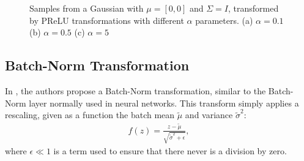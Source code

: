 \begin{figure}[!htb]
  \begin{subfigmatrix}{3}
  \end{subfigmatrix}
    \caption{Samples from a Gaussian with $\mu = [0, 0]$ and $\Sigma = I$, transformed
    by PReLU transformations with different $\alpha$ parameters. (a) $\alpha = 0.1$
    (b) $\alpha = 0.5$ (c) $\alpha = 5$}
  \label{fig:prelu}
\end{figure}

\subsection{Batch-Norm Transformation}
In \cite{realnvp}, the authors propose a Batch-Norm transformation, similar to
the Batch-Norm layer normally used in neural networks. This transform simply
applies a rescaling, given as a function the batch mean $\tilde\mu$ and variance
${\tilde\sigma}^2$:
\begin{align}
    f(z) = \frac{z - \tilde\mu}{\sqrt{{\tilde\sigma}^2 + \epsilon}},
\end{align} where $\epsilon \ll 1$ is a term used to ensure that there never is
a division by zero.

